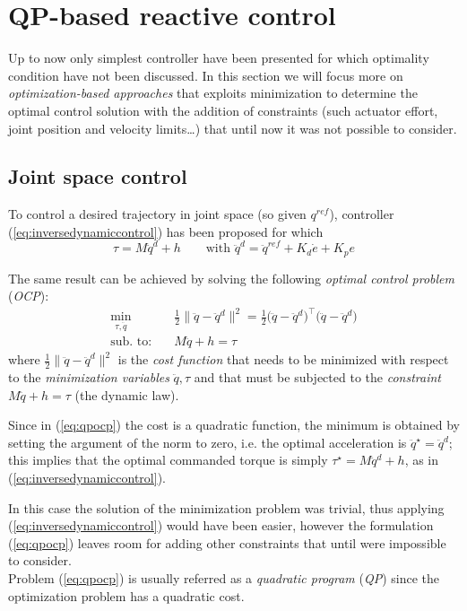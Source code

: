 	
\section{QP-based reactive control}
	Up to now only simplest controller have been presented for which optimality condition have not been discussed. In this section we will focus more on \textit{optimization-based approaches} that exploits minimization to determine the optimal control solution with the addition of constraints (such actuator effort, joint position and velocity limits\dots) that until now it was not possible to consider.
	
\subsection{Joint space control}
	To control a desired trajectory in joint space (so given $q^{ref}$), controller (\ref{eq:inversedynamiccontrol}) has been proposed for which
	\[ \tau = M \ddot q^d + h \qquad\textrm{with } \ddot q^d = \ddot q^{ref} + K_d \dot e + K_p e \]
	
	The same result can be achieved by solving the following \textit{optimal control problem} (\textit{OCP}):
	\begin{equation} \label{eq:qpocp}
	\begin{split}
		\min_{\tau, \ddot q}\quad & \frac 1 2 \big\|\ddot q - \ddot q^d \big\|^2 = \frac 1 2 \big(\ddot q - \ddot q^d\big)^\top \big(\ddot q - \ddot q^d\big) \\
		\textrm{sub. to:}\quad & M \ddot q + h = \tau
	\end{split}
	\end{equation}
	where $\frac 1 2 \big\|\ddot q - \ddot q^d \big\|^2$ is the \textit{cost function} that needs to be minimized with respect to the \textit{minimization variables} $\ddot q, \tau$ and that must be subjected to the \textit{constraint} $M\ddot q + h = \tau$ (the dynamic law).
	
	Since in (\ref{eq:qpocp}) the cost is a quadratic function, the minimum is obtained by setting the argument of the norm to zero, i.e. the optimal acceleration is $\ddot q^\star = \ddot q^d$; this implies that the optimal commanded torque is simply $\tau^\star = M \ddot q^d + h$, as in (\ref{eq:inversedynamiccontrol}).
	
	In this case the solution of the minimization problem was trivial, thus applying (\ref{eq:inversedynamiccontrol}) would have been easier, however the formulation (\ref{eq:qpocp}) leaves room for adding other constraints that until were impossible to consider. \\
	Problem (\ref{eq:qpocp}) is usually referred as a \textit{quadratic program} (\textit{QP}) since the optimization problem has a quadratic cost.
	
